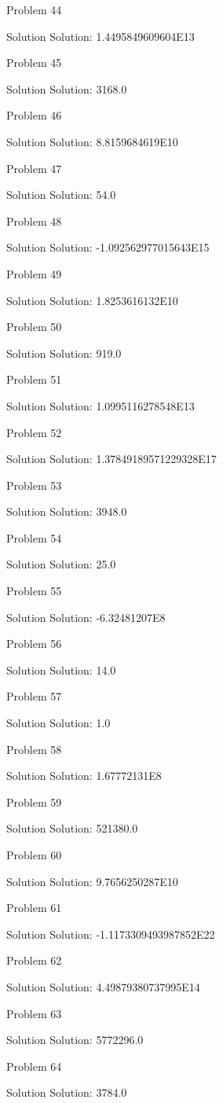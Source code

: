 \documentclass{article}
\begin{document}
Problem 44

Solution Solution: 1.4495849609604E13

Problem 45

Solution Solution: 3168.0

Problem 46

Solution Solution: 8.8159684619E10

Problem 47

Solution Solution: 54.0

Problem 48

Solution Solution: -1.092562977015643E15

Problem 49

Solution Solution: 1.8253616132E10

Problem 50

Solution Solution: 919.0

Problem 51

Solution Solution: 1.0995116278548E13

Problem 52

Solution Solution: 1.37849189571229328E17

Problem 53

Solution Solution: 3948.0

Problem 54

Solution Solution: 25.0

Problem 55

Solution Solution: -6.32481207E8

Problem 56

Solution Solution: 14.0

Problem 57

Solution Solution: 1.0

Problem 58

Solution Solution: 1.67772131E8

Problem 59

Solution Solution: 521380.0

Problem 60

Solution Solution: 9.7656250287E10

Problem 61

Solution Solution: -1.1173309493987852E22

Problem 62

Solution Solution: 4.49879380737995E14

Problem 63

Solution Solution: 5772296.0

Problem 64

Solution Solution: 3784.0
\end{document}
